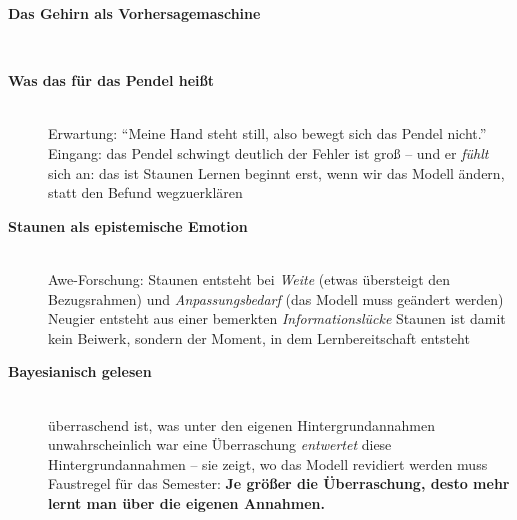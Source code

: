 \begin{description}
\item[{\rot\bf Das Gehirn als Vorhersagemaschine}]~\\[-\lblskip]
\begin{center}
\end{center}
\os{\newpage}

\item[{\rot\bf Was das für das Pendel heißt}]~\\[-\lblskip]
\bi
  \ite Erwartung: \enquote{Meine Hand steht still, also bewegt sich das
    Pendel nicht.}
  \ite Eingang: das Pendel schwingt deutlich
  \ite der Fehler ist groß -- und er \emph{fühlt} sich an: das ist Staunen
  \ite Lernen beginnt erst, wenn wir das Modell ändern, statt den Befund
    wegzuerklären
\ei
\os{\newpage}

\item[{\rot\bf Staunen als epistemische Emotion}]~\\[-\lblskip]
\bi
  \ite Awe-Forschung: Staunen entsteht bei \emph{Weite} (etwas übersteigt
    den Bezugsrahmen) und \emph{Anpassungsbedarf} (das Modell muss
    geändert werden) \parencite{keltner2003}
  \ite Neugier entsteht aus einer bemerkten \emph{Informationslücke}
    \parencite{loewenstein1994}
  \ite Staunen ist damit kein Beiwerk, sondern der Moment, in dem
    Lernbereitschaft entsteht
\ei
\os{\newpage}

\item[{\rot\bf Bayesianisch gelesen}]~\\[-\lblskip]
\bi
  \ite überraschend ist, was unter den eigenen Hintergrundannahmen
    unwahrscheinlich war
  \ite eine Überraschung \emph{entwertet} diese Hintergrundannahmen --
    sie zeigt, wo das Modell revidiert werden muss
    \parencite{horwich1982probability}
  \ite Faustregel für das Semester: \textbf{Je größer die Überraschung,
    desto mehr lernt man über die eigenen Annahmen.}
\ei
\os{\newpage}
\end{description}


